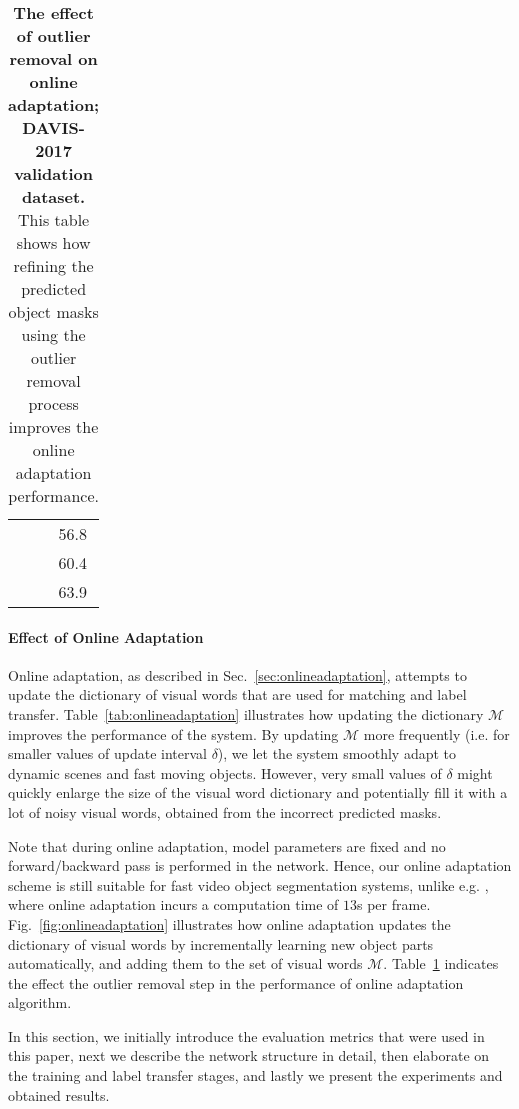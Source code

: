 \documentclass[10pt,twocolumn,letterpaper]{article}
\newcommand{\cmark}{\ding{51}}%
\newcommand{\xmark}{\ding{55}}%
\begin{document}
\begin{table}[t]
\begin{tabular}{ccc}
		\cmark &\xmark & 56.8  \\ 
		\xmark &\cmark & 60.4  \\ 
		\cmark &\cmark & 63.9  \\ 
	    \hline
	\end{tabular}
	\vspace{-0.1in}
	\caption{{\bf The effect of outlier removal on online adaptation; DAVIS-2017 validation dataset.} This table shows how refining the predicted object masks using the outlier removal process improves the online adaptation performance. }
	\label{table:outlierremoval}
	\vspace{-0.2in}
\end{table}\paragraph{Effect of Online Adaptation}
Online adaptation, as described in Sec.~\ref{sec:onlineadaptation}, attempts to update the dictionary of visual words that are used for matching and label transfer. Table~\ref{tab:onlineadaptation} illustrates how updating the dictionary $\mathcal{M}$ improves the performance of the system. By updating $\mathcal{M}$ more frequently (i.e. for smaller values of update interval $\delta$), we let the system smoothly adapt to dynamic scenes and fast moving objects. However, very small values of $\delta$ might quickly enlarge the size of the visual word dictionary and potentially fill it with a lot of noisy visual words, obtained from the incorrect predicted masks. 

Note that during online adaptation, model parameters are fixed and no forward/backward pass is performed in the network. Hence, our online adaptation scheme is still suitable for fast video object segmentation systems, unlike e.g. \cite{onavos}, where online adaptation incurs a computation time of $13$s per frame.
Fig.~\ref{fig:onlineadaptation} illustrates how online adaptation updates the dictionary of visual words by incrementally learning new object parts automatically, and adding them to the set of visual words $\mathcal{M}$.
Table~\ref{table:outlierremoval} indicates the effect the outlier removal step in the performance of online adaptation algorithm.

In this section, we initially introduce the evaluation metrics that were used in this paper, next we describe the network structure in detail, then elaborate on the training and label transfer stages, and lastly we present the experiments and obtained results.
\end{document}
